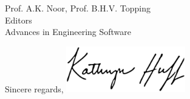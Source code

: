 \documentclass[11pt]{letter} %
\begin{document}
\begin{letter}{Prof. A.K. Noor, Prof. B.H.V. Topping\\
Editors\\
Advances in Engineering Software}
\closing{Sincere regards,
\includegraphics[height=2cm]{signature}\\
}


\end{letter}
\end{document}
